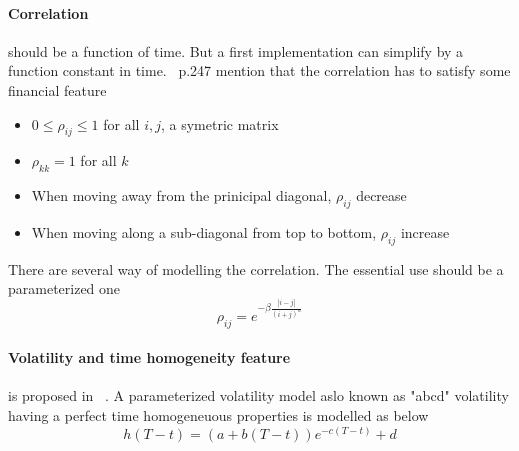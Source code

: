 \documentclass[a4paper,10pt]{article}
\newcommand{\rhoij}{\rho_{ij}}
\begin{document}
\paragraph{Correlation} should be a function of time. But a first implementation can simplify by a function constant in time. ~\cite{BRIGO2006}p.247 mention that the correlation has to satisfy some financial feature
\begin{itemize}
\item $0 \leq \rhoij \leq 1 $ for all $i,j$, a symetric matrix
\item $\rho_{kk} = 1 $ for all $k$ 
\item When moving away from the prinicipal diagonal, $\rhoij$ decrease 
\item When moving along a sub-diagonal from top to bottom, $\rhoij$ increase 
\end{itemize} 
There are several way of modelling the correlation. The essential use should be a parameterized one
\[
\rhoij = e^{- \beta \frac{ |i-j| }{(i+j)^{\alpha}}}
\]
\paragraph{Volatility and time homogeneity feature} is proposed in ~\cite{REBONATO2002}. A parameterized volatility model aslo known as "abcd" volatility having a perfect time homogeneuous properties is modelled as below
\[
h(T-t) = (a + b(T-t)) e^{-c(T-t)} + d
\]
\begin {figure}[h]
\begin{center}

\end{center}
\end {figure}
\end{document}
